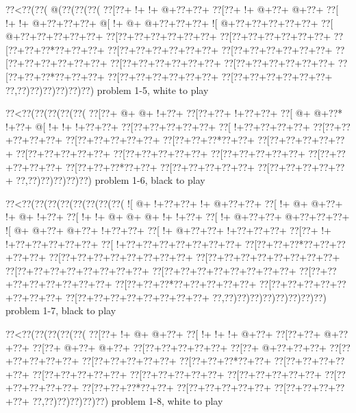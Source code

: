 \vbox{\vbox{\goo
\0??<\0??(\0??(\- @(\0??(\0??(\0??(
\0??[\0??+\- !+\- !+\- @+\0??+\0??+
\0??[\0??+\- !+\- @+\0??+\- @+\0??+
\0??[\- !+\- !+\- @+\0??+\0??+\0??+
\- @[\- !+\- @+\- @+\0??+\0??+\0??+
\- ![\- @+\0??+\0??+\0??+\0??+\0??+
\0??[\- @+\0??+\0??+\0??+\0??+\0??+
\0??[\0??+\0??+\0??+\0??+\0??+\0??+
\0??[\0??+\0??+\0??+\0??+\0??+\0??+
\0??[\0??+\0??+\0??*\0??+\0??+\0??+
\0??[\0??+\0??+\0??+\0??+\0??+\0??+
\0??[\0??+\0??+\0??+\0??+\0??+\0??+
\0??[\0??+\0??+\0??+\0??+\0??+\0??+
\0??[\0??+\0??+\0??+\0??+\0??+\0??+
\0??[\0??+\0??+\0??+\0??+\0??+\0??+
\0??[\0??+\0??+\0??*\0??+\0??+\0??+
\0??[\0??+\0??+\0??+\0??+\0??+\0??+
\0??[\0??+\0??+\0??+\0??+\0??+\0??+
\0??,\0??)\0??)\0??)\0??)\0??)\0??)
}
\hfil problem 1-5, white to play\hfil\break
}

\vbox{\vbox{\goo
\0??<\0??(\0??(\0??(\0??(\0??(
\0??[\0??+\- @+\- @+\- !+\0??+
\0??[\0??+\0??+\- !+\0??+\0??+
\0??[\- @+\- @+\0??*\- !+\0??+
\- @[\- !+\- !+\- !+\0??+\0??+
\0??[\0??+\0??+\0??+\0??+\0??+
\0??[\- !+\0??+\0??+\0??+\0??+
\0??[\0??+\0??+\0??+\0??+\0??+
\0??[\0??+\0??+\0??+\0??+\0??+
\0??[\0??+\0??+\0??*\0??+\0??+
\0??[\0??+\0??+\0??+\0??+\0??+
\0??[\0??+\0??+\0??+\0??+\0??+
\0??[\0??+\0??+\0??+\0??+\0??+
\0??[\0??+\0??+\0??+\0??+\0??+
\0??[\0??+\0??+\0??+\0??+\0??+
\0??[\0??+\0??+\0??*\0??+\0??+
\0??[\0??+\0??+\0??+\0??+\0??+
\0??[\0??+\0??+\0??+\0??+\0??+
\0??,\0??)\0??)\0??)\0??)\0??)
}
\hfil problem 1-6, black to play\hfil\break
}

\vbox{\vbox{\goo
\0??<\0??(\0??(\0??(\0??(\0??(\0??(\0??(\0??(
\- ![\- @+\- !+\0??+\0??+\- !+\- @+\0??+\0??+
\0??[\- !+\- @+\- @+\0??+\- !+\- @+\- !+\0??+
\0??[\- !+\- !+\- @+\- @+\- @+\- !+\- !+\0??+
\0??[\- !+\- @+\0??+\0??+\- @+\0??+\0??+\0??+
\- ![\- @+\- @+\0??+\- @+\0??+\- !+\0??+\0??+
\0??[\- !+\- @+\0??+\0??+\- !+\0??+\0??+\0??+
\0??[\0??+\- !+\- !+\0??+\0??+\0??+\0??+\0??+
\0??[\- !+\0??+\0??+\0??+\0??+\0??+\0??+\0??+
\0??[\0??+\0??+\0??*\0??+\0??+\0??+\0??+\0??+
\0??[\0??+\0??+\0??+\0??+\0??+\0??+\0??+\0??+
\0??[\0??+\0??+\0??+\0??+\0??+\0??+\0??+\0??+
\0??[\0??+\0??+\0??+\0??+\0??+\0??+\0??+\0??+
\0??[\0??+\0??+\0??+\0??+\0??+\0??+\0??+\0??+
\0??[\0??+\0??+\0??+\0??+\0??+\0??+\0??+\0??+
\0??[\0??+\0??+\0??*\0??+\0??+\0??+\0??+\0??+
\0??[\0??+\0??+\0??+\0??+\0??+\0??+\0??+\0??+
\0??[\0??+\0??+\0??+\0??+\0??+\0??+\0??+\0??+
\0??,\0??)\0??)\0??)\0??)\0??)\0??)\0??)\0??)
}
\hfil problem 1-7, black to play\hfil\break
}

\vbox{\vbox{\goo
\0??<\0??(\0??(\0??(\0??(\0??(
\0??[\0??+\- !+\- @+\- @+\0??+
\0??[\- !+\- !+\- !+\- @+\0??+
\0??[\0??+\0??+\- @+\0??+\0??+
\0??[\0??+\- @+\0??+\- @+\0??+
\0??[\0??+\0??+\0??+\0??+\0??+
\0??[\0??+\- @+\0??+\0??+\0??+
\0??[\0??+\0??+\0??+\0??+\0??+
\0??[\0??+\0??+\0??+\0??+\0??+
\0??[\0??+\0??+\0??*\0??+\0??+
\0??[\0??+\0??+\0??+\0??+\0??+
\0??[\0??+\0??+\0??+\0??+\0??+
\0??[\0??+\0??+\0??+\0??+\0??+
\0??[\0??+\0??+\0??+\0??+\0??+
\0??[\0??+\0??+\0??+\0??+\0??+
\0??[\0??+\0??+\0??*\0??+\0??+
\0??[\0??+\0??+\0??+\0??+\0??+
\0??[\0??+\0??+\0??+\0??+\0??+
\0??,\0??)\0??)\0??)\0??)\0??)
}
\hfil problem 1-8, white to play\hfil\break
}


